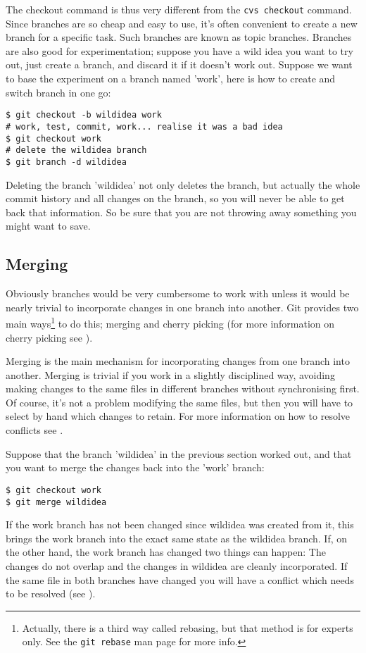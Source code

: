 \documentclass[a4paper,10pt]{article}
\begin{document}
The checkout command is thus very
different from the \texttt{cvs checkout} command.
Since branches are so cheap and easy to use, it's often convenient to create a
new branch for a specific task. Such branches are known as topic branches.
Branches are also good for experimentation; suppose you have a wild idea you
want to try out, just create a branch, and discard it if it doesn't work out.
Suppose we want to base the experiment on a branch named 'work', here is how to
create and switch branch in one go:
\begin{verbatim}
$ git checkout -b wildidea work
# work, test, commit, work... realise it was a bad idea
$ git checkout work
# delete the wildidea branch
$ git branch -d wildidea
\end{verbatim}
Deleting the branch 'wildidea' not only deletes the branch, but actually the
whole commit history and all changes on the branch, so you will never be able
to get back that information. So be sure that you are not throwing away
something you might want to save.

\subsection{Merging}
Obviously branches would be very cumbersome to work with unless it would be
nearly trivial to incorporate changes in one branch into another. Git provides
two main ways\footnote{Actually, there is a third way called rebasing, but
that method is for experts only. See the \texttt{git rebase} man page for more
info.} to do this; merging and cherry
picking (for more information on cherry picking see ).

Merging is the main mechanism for incorporating changes from one branch 
into another. Merging is trivial if you work in a slightly disciplined
way, avoiding making changes to the same files in different branches without
synchronising first. Of course, it's not a problem modifying the same files,
but then you will have to select by hand which changes to retain. For more
information on how to resolve conflicts see .

Suppose that the branch 'wildidea' in the previous section worked out, and
that you want to merge the changes back into the 'work' branch:
\begin{verbatim}
$ git checkout work
$ git merge wildidea
\end{verbatim}
If the work branch has not been changed since wildidea was created from it, 
this brings the work branch into 
the exact same state as the  wildidea branch. If, on the other hand, the work
branch has changed two things can happen: The changes do not overlap and the
changes in wildidea are cleanly incorporated. If the same file in both
branches have changed you will have a conflict which needs to be resolved
(see ).
\end{document}
